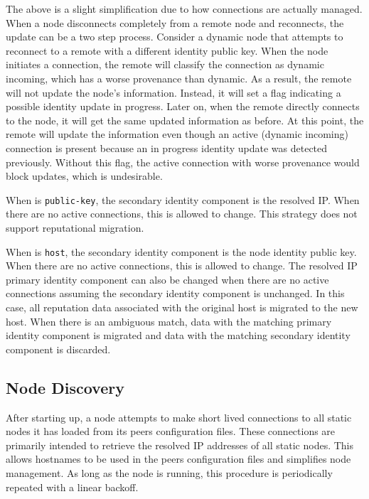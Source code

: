 The above is a slight simplification due to how connections are actually managed.
When a node disconnects completely from a remote node and reconnects, the update can be a two step process.
Consider a dynamic node that attempts to reconnect to a remote with a different identity public key.
When the node initiates a connection, the remote will classify the connection as dynamic incoming, which has a worse provenance than dynamic.
As a result, the remote will not update the node's information.
Instead, it will set a flag indicating a possible identity update in progress.
Later on, when the remote directly connects to the node, it will get the same updated information as before.
At this point, the remote will update the information even though an active (dynamic incoming) connection is present because an in progress identity update was detected previously.
Without this flag, the active connection with worse provenance would block updates, which is undesirable.

When  is \texttt{public-key}, the secondary identity component is the resolved IP.
When there are no active connections, this is allowed to change.
This strategy does not support reputational migration.

When  is \texttt{host}, the secondary identity component is the node identity public key.
When there are no active connections, this is allowed to change.
The resolved IP primary identity component can also be changed when there are no active connections assuming the secondary identity component is unchanged.
In this case, all reputation data associated with the original host is migrated to the new host.
When there is an ambiguous match, data with the matching primary identity component is migrated and data with the matching secondary identity component is discarded.

\subsection{Node Discovery}
\label{sec:network:discovery}

After starting up, a node attempts to make short lived connections to all static nodes it has loaded from its peers configuration files.
These connections are primarily intended to retrieve the resolved IP addresses of all static nodes.
This allows hostnames to be used in the peers configuration files and simplifies node management.
As long as the node is running, this procedure is periodically repeated with a linear backoff.

